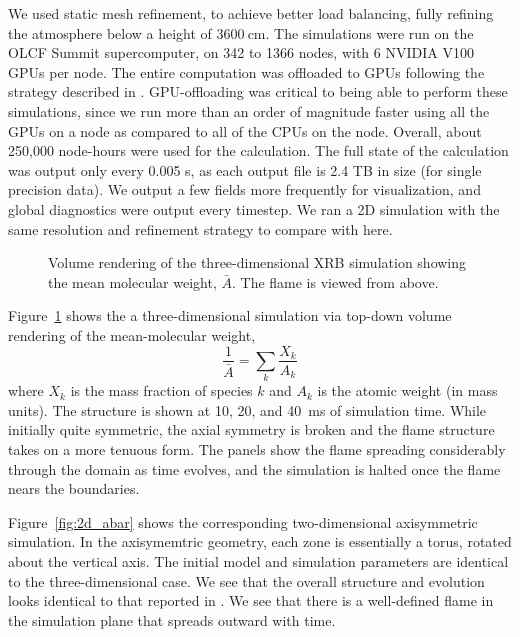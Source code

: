 \documentclass[twocolumn,times,tighten]{aastex631}
\begin{document}
We used static mesh refinement, to achieve better load balancing,
fully refining the atmosphere below a height of $3600~\mathrm{cm}$.
The simulations were run on the OLCF Summit supercomputer, on 342 to
1366 nodes, with 6 NVIDIA V100 GPUs per node.  The entire computation
was offloaded to GPUs following the strategy described in
\citet{castro_gpu}.  GPU-offloading was critical to being able to
perform these simulations, since we run more than an order of
magnitude faster using all the GPUs on a node as compared to all of
the CPUs on the node.  Overall, about 250,000 node-hours were used for
the calculation.  The full state of the calculation was output only
every 0.005 s, as each output file is 2.4 TB in size (for single
precision data).  We output a few fields more frequently for
visualization, and global diagnostics were output every timestep.  We
ran a 2D simulation with the same resolution and refinement strategy
to compare with here.

\begin{figure}[t]
\centering
\caption{\label{fig:vr_abar} Volume rendering of the three-dimensional XRB
simulation showing the mean molecular weight, $\bar{A}$.  The flame is viewed
from above.}
\end{figure}

Figure~\ref{fig:vr_abar} shows the a three-dimensional simulation via
top-down volume rendering of the mean-molecular weight,
\begin{equation}
\frac{1}{\bar{A}} = \sum_k \frac{X_k}{A_k}
\end{equation}
where $X_k$ is the mass fraction of species $k$ and $A_k$ is the
atomic weight (in mass units).  The structure is shown at 10, 20, and
40~ms of simulation time.  While initially quite symmetric, the axial
symmetry is broken and the flame structure takes on a more tenuous
form.  The panels show the flame spreading considerably through the
domain as time evolves, and the simulation is halted once the flame
nears the boundaries.  

Figure~\ref{fig:2d_abar} shows the corresponding two-dimensional
axisymmetric simulation.  In the axisymemtric geometry, each zone is essentially
a torus, rotated about the vertical axis.  The initial model and simulation parameters
are identical to the three-dimensional case.  We see that
the overall structure and evolution looks identical to that reported
in \cite{harpole:2021}.  We see that there is a well-defined flame in the simulation plane
that spreads outward with time.
\end{document}
